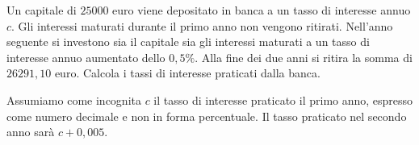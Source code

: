 %  
\begin{problema}
Un capitale di \(25000\) euro viene depositato in banca a un tasso di interesse 
annuo \(c\). Gli interessi maturati durante il primo anno non vengono ritirati.
Nell'anno seguente si investono sia il capitale sia gli interessi maturati a un 
tasso di interesse annuo aumentato dello \(0,5\%\). Alla fine dei due anni si 
ritira
la somma di \(26291,10\) euro. Calcola i tassi di interesse praticati dalla 
banca.
\end{problema}
Assumiamo come incognita \(c\) il tasso di interesse praticato il primo anno, 
espresso come numero decimale e
non in forma percentuale. Il tasso praticato nel secondo anno sarà \(c+0,005\).


